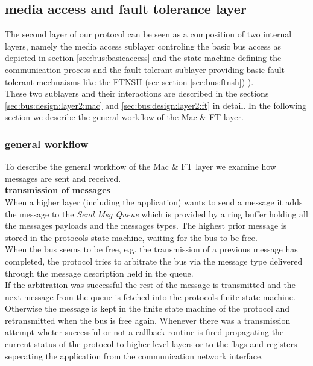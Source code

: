 \subsection{media access and fault tolerance layer}
\label{sec:bus:design:layer2}

The second layer of our protocol can be seen as a composition of two internal layers, 
namely the media access sublayer controling the basic bus access as depicted in section 
\ref{sec:bus:basicaccess}  and the state machine defining 
the communication process and the fault tolerant sublayer providing basic fault 
tolerant mechnaisms like the FTNSH (see section \ref{sec:bus:ftnsh}) ).\\

These two sublayers and their interactions are described in the sections 
\ref{sec:bus:design:layer2:mac}  and 
\ref{sec:bus:design:layer2:ft}  in detail. 
In the following section we describe the general workflow of the Mac \& FT layer.\\

\subsubsection{general workflow}

To describe the general workflow of the Mac \& FT layer we examine how messages are sent and received.\\

\textbf{transmission of messages}\\
When a higher layer (including the application) wants to send a message it adds the message to the \textit{Send Msg Queue} which is provided
by a ring buffer holding all the messages payloads and the messages types. The highest prior message is stored in the protocols state machine, waiting for the bus to be free.\\

When the bus seems to be free, e.g. the transmission of a previous message has completed, the protocol tries to arbitrate the bus via the message type delivered through the message description held in the queue.\\

If the arbitration was successful the rest of the message is transmitted and the next message from the queue is fetched into the protocols finite state machine. Otherwise the message is kept in the finite state machine of the protocol and retransmitted when the bus is free again.
Whenever there was a transmission attempt wheter successful or not a callback routine is fired propagating the current status of the protocol to higher level layers or to the flags and registers seperating the application from the communication network interface.\\


